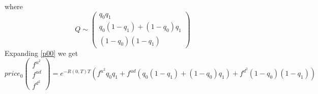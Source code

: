 where
\begin{equation}
    Q \sim \left(
    \begin{matrix}
        q_0q_1 \\ q_0(1-q_1)+(1-q_0)q_1 \\ (1-q_0)(1-q_1)
    \end{matrix}
    \right) 
\end{equation}
Expanding \eqref{p00} we get 
\begin{equation}
    price_0
    \left(
    \begin{matrix}
        f^{u^2} \\ f^{ud} \\ f^{d^2}
    \end{matrix}
    \right) 
    = e^{-R(0,T)T}(f^{u^2}q_0q_1 + f^{ud}(q_0(1-q_1)+(1-q_0)q_1) + f^{d^2}(1-q_0)(1-q_1))
\end{equation}